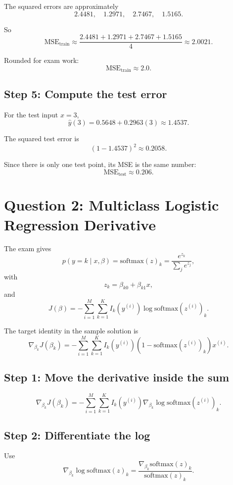 \documentclass[11pt]{article}
\begin{document}
The squared errors are approximately
\[
    2.4481,\quad 1.2971,\quad 2.7467,\quad 1.5165.
\]

So
\[
    \text{MSE}_{\text{train}}
    \approx
    \frac{2.4481+1.2971+2.7467+1.5165}{4}
    \approx 2.0021.
\]

Rounded for exam work:
\[
    \boxed{\text{MSE}_{\text{train}} \approx 2.0.}
\]

\subsection*{Step 5: Compute the test error}

For the test input \(x=3\),
\[
    \hat y(3)=0.5648+0.2963(3)\approx 1.4537.
\]

The squared test error is
\[
    (1-1.4537)^2 \approx 0.2058.
\]

Since there is only one test point, its MSE is the same number:
\[
    \boxed{\text{MSE}_{\text{test}} \approx 0.206.}
\]

\section*{Question 2: Multiclass Logistic Regression Derivative}

The exam gives
\[
    p(y=k\mid x,\beta)=\text{softmax}(z)_k
    =
    \frac{e^{z_k}}{\sum_j e^{z_j}},
\]
with
\[
    z_k = \beta_{k0} + \beta_{k1}x,
\]
and
\[
    J(\beta)
    =
    -\sum_{i=1}^{M}\sum_{k=1}^{K} I_k(y^{(i)})\log \text{softmax}(z^{(i)})_k.
\]

The target identity in the sample solution is
\[
    \nabla_{\beta_k}J(\beta_k)
    =
    -\sum_{i=1}^{M}\sum_{k=1}^{K}
    I_k(y^{(i)})
    \left(1-\text{softmax}(z^{(i)})_k\right)x^{(i)}.
\]

\subsection*{Step 1: Move the derivative inside the sum}

\[
    \nabla_{\beta_k}J(\beta_k)
    =
    -\sum_{i=1}^{M}\sum_{k=1}^{K}
    I_k(y^{(i)})
    \nabla_{\beta_k}\log \text{softmax}(z^{(i)})_k.
\]

\subsection*{Step 2: Differentiate the log}

Use
\[
    \nabla_{\beta_k}\log \text{softmax}(z)_k
    =
    \frac{\nabla_{\beta_k}\text{softmax}(z)_k}{\text{softmax}(z)_k}.
\]
\end{document}
